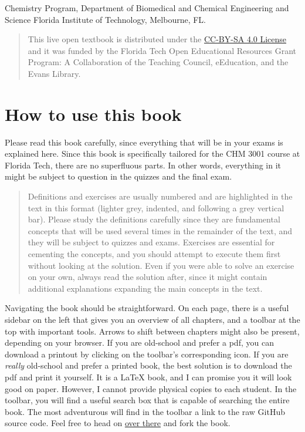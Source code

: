 \documentclass[
  9pt,
]{extbook}
\theoremstyle{definition}
\theoremstyle{definition}
\theoremstyle{definition}
\theoremstyle{remark}
\begin{document}
Chemistry Program, Department of Biomedical and Chemical Engineering and Science
Florida Institute of Technology, Melbourne, FL.

\begin{quote}
This live open textbook is distributed under the \href{https://creativecommons.org/licenses/by-sa/4.0/}{CC-BY-SA 4.0 License} and it was funded by the Florida Tech Open Educational Resources Grant Program: A Collaboration of the Teaching Council, eEducation, and the Evans Library.
\end{quote}

\hypertarget{how-to-use-this-book}{%
\section*{How to use this book}\label{how-to-use-this-book}}

Please read this book carefully, since everything that will be in your exams is explained here.
Since this book is specifically tailored for the CHM 3001 course at Florida Tech, there are no superfluous parts. In other words, everything in it might be subject to question in the quizzes and the final exam.

\begin{quote}
Definitions and exercises are usually numbered and are highlighted in the text in this format (lighter grey, indented, and following a grey vertical bar). Please study the definitions carefully since they are fundamental concepts that will be used several times in the remainder of the text, and they will be subject to quizzes and exams. Exercises are essential for cementing the concepts, and you should attempt to execute them first without looking at the solution. Even if you were able to solve an exercise on your own, always read the solution after, since it might contain additional explanations expanding the main concepts in the text.
\end{quote}

Navigating the book should be straightforward. On each page, there is a useful sidebar on the left that gives you an overview of all chapters, and a toolbar at the top with important tools. Arrows to shift between chapters might also be present, depending on your browser. If you are old-school and prefer a pdf, you can download a printout by clicking on the toolbar's corresponding icon. If you are \emph{really} old-school and prefer a printed book, the best solution is to download the pdf and print it yourself. It is a LaTeX book, and I can promise you it will look good on paper. However, I cannot provide physical copies to each student. In the toolbar, you will find a useful search box that is capable of searching the entire book. The most adventurous will find in the toolbar a link to the raw GitHub source code. Feel free to head on \href{https://github.com/peverati/PChem1}{over there} and fork the book.
\end{document}
